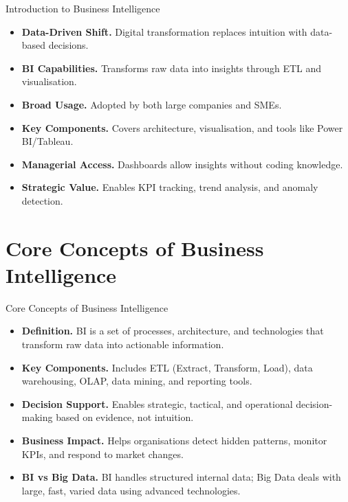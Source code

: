 \documentclass[aspectratio=169, table]{beamer}
\begin{document}
\begin{frame}{Introduction to Business Intelligence}
	\vspace{20pt}
	\begin{itemize}
		\item \textbf{Data-Driven Shift.} Digital transformation replaces intuition with data-based decisions.
		\item \textbf{BI Capabilities.} Transforms raw data into insights through ETL and visualisation.
		\item \textbf{Broad Usage.} Adopted by both large companies and SMEs.
		\item \textbf{Key Components.} Covers architecture, visualisation, and tools like Power BI/Tableau.
		\item \textbf{Managerial Access.} Dashboards allow insights without coding knowledge.
		\item \textbf{Strategic Value.} Enables KPI tracking, trend analysis, and anomaly detection.
	\end{itemize}
\end{frame}

\section{Core Concepts of Business Intelligence}

\begin{frame}{Core Concepts of Business Intelligence}
	\vspace{20pt}
	\begin{itemize}
		\item \textbf{Definition.} BI is a set of processes, architecture, and technologies that transform raw data into actionable information.
		\item \textbf{Key Components.} Includes ETL (Extract, Transform, Load), data warehousing, OLAP, data mining, and reporting tools.
		\item \textbf{Decision Support.} Enables strategic, tactical, and operational decision-making based on evidence, not intuition.
		\item \textbf{Business Impact.} Helps organisations detect hidden patterns, monitor KPIs, and respond to market changes.
		\item \textbf{BI vs Big Data.} BI handles structured internal data; Big Data deals with large, fast, varied data using advanced technologies.
	\end{itemize}
\end{frame}
\end{document}
